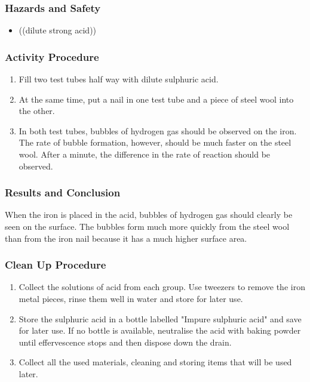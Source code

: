 \subsubsection*{Hazards and Safety}
\begin{itemize}
\item{((dilute strong acid))}
\end{itemize}

\subsubsection*{Activity Procedure}
\begin{enumerate}
\item{Fill two test tubes half way with dilute sulphuric acid.}
\item{At the same time, put a nail in one test tube and a piece of steel wool into the other.}
\item{In both test tubes, bubbles of hydrogen gas should be observed on the iron. The rate of bubble formation, however, should be much faster on the steel wool. After a minute, the difference in the rate of reaction should be observed.}
\end{enumerate}

\subsubsection*{Results and Conclusion}
When the iron is placed in the acid, bubbles of hydrogen gas should clearly be seen on the surface. The bubbles form much more quickly from the steel wool than from the iron nail because it has a much higher surface area.

\subsubsection*{Clean Up Procedure}
\begin{enumerate}
\item{Collect the solutions of acid from each group. Use tweezers to remove the iron metal pieces, rinse them well in water and store for later use.}
\item{Store the sulphuric acid in a bottle labelled "Impure sulphuric acid" and save for later use. If no bottle is available, neutralise the acid with baking powder until effervescence stops and then dispose down the drain.}
\item{Collect all the used materials, cleaning and storing items that will be used later.}
\end{enumerate}

